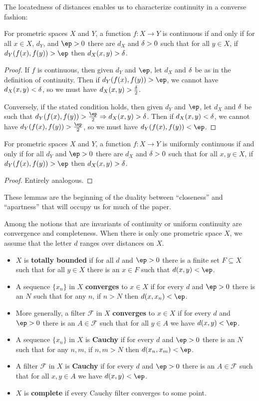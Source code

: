 \documentclass{article}
\def\F{\mathcal{F}}
\let\implies\Rightarrow
\def\hfep{\frac{\ep}{2}}
\begin{document}
The locatedness of distances enables us to characterize continuity in a converse fashion:

\begin{lem}\label{thm:cocontinuous}
  For prometric spaces $X$ and $Y$, a function $f:X\to Y$ is continuous if and only if for all $x\in X$, $d_Y$, and $\ep>0$ there are $d_X$ and $\delta>0$ such that for all $y\in X$, if $d_Y(f(x),f(y))>\ep$ then $d_X(x,y)>\delta$.
\end{lem}
\begin{proof}
  If $f$ is continuous, then given $d_Y$ and $\ep$, let $d_X$ and $\delta$ be as in the definition of continuity.
  Then if $d_Y(f(x),f(y)) > \ep$, we cannot have $d_X(x,y) < \delta$, so we must have $d_X(x,y) > \frac{\delta}{2}$.

  Conversely, if the stated condition holds, then given $d_Y$ and $\ep$, let $d_X$ and $\delta$ be such that $d_Y(f(x),f(y))>\hfep \implies d_X(x,y)>\de$.
  Then if $d_X(x,y)<\delta$, we cannot have $d_Y(f(x),f(y))>\hfep$, so we must have $d_Y(f(x),f(y))<\ep$.
\end{proof}

\begin{lem}\label{thm:unif-cocontinuous}
  For prometric spaces $X$ and $Y$, a function $f:X\to Y$ is uniformly continuous if and only if for all $d_Y$ and $\ep>0$ there are $d_X$ and $\delta>0$ such that for all $x,y\in X$, if $d_Y(f(x),f(y))>\ep$ then $d_X(x,y)>\delta$.
\end{lem}
\begin{proof}
  Entirely analogous.
\end{proof}

These lemmas are the beginning of the duality between ``closeness'' and ``apartness'' that will occupy us for much of the paper.

Among the notions that are invariants of continuity or uniform continuity are convergence and completeness.
When there is only one prometric space $X$, we assume that the letter $d$ ranges over distances on $X$.

\begin{itemize}
\item $X$ is \textbf{totally bounded} if for all $d$ and $\ep>0$ there is a finite set $F\subseteq X$ such that for all $y\in X$ there is an $x\in F$ such that $d(x,y)<\ep$.
\item A sequence $\{x_n\}$ in $X$ \textbf{converges} to $x\in X$ if for every $d$ and $\ep>0$ there is an $N$ such that for any $n$, if $n>N$ then $d(x,x_n)<\ep$.
\item More generally, a filter $\F$ in $X$ \textbf{converges} to $x\in X$ if for every $d$ and $\ep>0$ there is an $A\in\F$ such that for all $y\in A$ we have $d(x,y)<\ep$.
\item A sequence $\{x_n\}$ in $X$ is \textbf{Cauchy} if for every $d$ and $\ep>0$ there is an $N$ such that for any $n,m$, if $n,m>N$ then $d(x_n,x_m)<\ep$.
\item A filter $\F$ in $X$ is \textbf{Cauchy} if for every $d$ and $\ep>0$ there is an $A\in\F$ such that for all $x,y\in A$ we have $d(x,y)<\ep$.
\item $X$ is \textbf{complete} if every Cauchy filter converges to some point.
\end{itemize}
\end{document}
